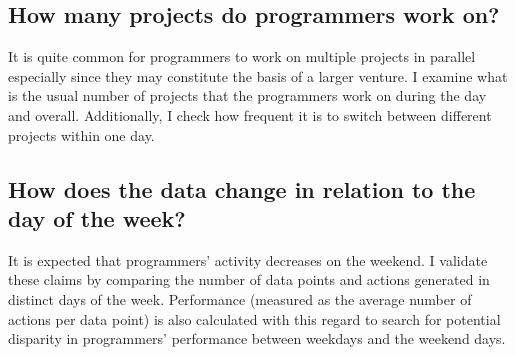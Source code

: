 \subsection{How many projects do programmers work on?}

It is quite common for programmers to work on multiple projects in parallel especially since they may constitute the basis of a larger venture. I examine what is the usual number of projects that the programmers work on during the day and overall. Additionally, I check how frequent it is to switch between different projects within one day.



\subsection{How does the data change in relation to the day of the week?}

It is expected that programmers' activity decreases on the weekend. I validate these claims by comparing the number of data points and actions generated in distinct days of the week. Performance (measured as the average number of actions per data point) is also calculated with this regard to search for potential disparity in programmers' performance between weekdays and the weekend days.

